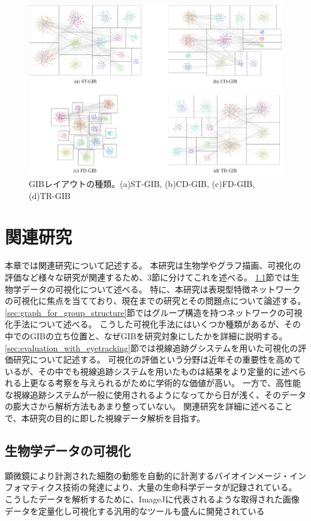 \documentclass{kuee}
\begin{document}
\begin{figure}
  \centering
  \label{fig:example_GIB}
  \includegraphics[width=15cm]{./images/examples.png}
  \caption{GIBレイアウトの種類。(a)ST-GIB, (b)CD-GIB, (c)FD-GIB, (d)TR-GIB}
\end{figure}


\chapter{関連研究}
\label{chap:relatedwork}

本章では関連研究について記述する。
本研究は生物学やグラフ描画、可視化の評価など様々な研究が関連するため、3節に分けてこれを述べる。
\ref{sec:vis_bio}節では生物学データの可視化について述べる。
特に、本研究は表現型特徴ネットワークの可視化に焦点を当てており、現在までの研究とその問題点について論述する。
\ref{sec:graph_for_group_structure}節ではグループ構造を持つネットワークの可視化手法について述べる。
こうした可視化手法にはいくつか種類があるが、その中でのGIBの立ち位置と、なぜGIBを研究対象にしたかを詳細に説明する。
\ref{sec:evaluation_with_eyetracking}節では視線追跡グシステムを用いた可視化の評価研究について記述する。
可視化の評価という分野は近年その重要性を高めているが、その中でも視線追跡システムを用いたものは結果をより定量的に述べられる上更なる考察を与えられるがために学術的な価値が高い。
一方で、高性能な視線追跡システムが一般に使用されるようになってから日が浅く、そのデータの膨大さから解析方法もあまり整っていない。
関連研究を詳細に述べることで、本研究の目的に即した視線データ解析を目指す。

\section{生物学データの可視化}
\label{sec:vis_bio}
顕微鏡により計測された細胞の動態を自動的に計測するバイオインメージ・インフォマティクス技術の発達により、大量の生命科学データが記録されている。
こうしたデータを解析するために、ImageJ\cite{schneider2012nih}に代表されるような取得された画像データを定量化し可視化する汎用的なツールも盛んに開発されている\cite{schindelin2012fiji,carpenter2006cellprofiler,Chen491035}
\end{document}
